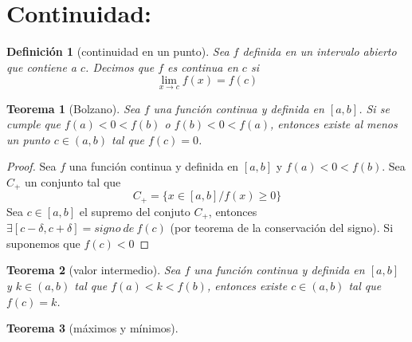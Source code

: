 \documentclass{article}
\newtheorem*{theorem}{Teorema}
\newtheorem*{definition}{Definición}
\begin{document}
  \section*{Continuidad:}
    \begin{definition}[continuidad en un punto]
      Sea $f$ definida en un intervalo abierto que contiene a $c$. Decimos que $f$ es 
      continua en $c$ si
      \[
        \lim_{x\to c}f(x)=f(c)
      \]
    \end{definition}
    \begin{theorem}[Bolzano]
      Sea $f$ una función continua y definida en $[a,b]$. Si se cumple que $f(a)<0<f(b)$ o 
      $f(b)<0<f(a)$, entonces existe al menos un punto $c\in(a,b)$ tal que $f(c)=0$.
    \end{theorem}
    \begin{proof}
      Sea $f$ una función continua y definida en $[a,b]$ y $f(a)<0<f(b)$. Sea $C_+$ un
      conjunto tal que
      \[
        C_+=\{x\in[a,b]/f(x)\geqslant0\}
      \]
      Sea $c\in[a,b]$ el supremo del conjuto $C_+$, entonces $\exists[c-\delta,c+\delta]=
      signo\ de\ f(c)$ (por teorema de la conservación del signo). Si suponemos que $f(c)<0$
    \end{proof}
    
    \begin{theorem}[valor intermedio]
      Sea $f$ una función continua y definida en $[a,b]$ y $k\in(a,b)$ tal que $f(a)<k<f(b)$,
      entonces existe $c\in(a,b)$ tal que $f(c)=k$.
    \end{theorem}
    \begin{theorem}[máximos y mínimos]
    \end{theorem}
    
\end{document}
